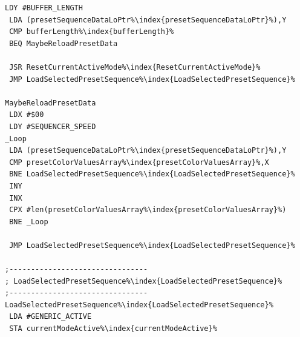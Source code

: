 \begin{minipage}[b]{0.33\linewidth}
\begin{lrbox}{\mybox}
\begin{lstlisting}[basicstyle=\ttfamily\tiny,escapechar=\%]
 LDY #BUFFER_LENGTH
 LDA (presetSequenceDataLoPtr%\index{presetSequenceDataLoPtr}%),Y
 CMP bufferLength%\index{bufferLength}%
 BEQ MaybeReloadPresetData

 JSR ResetCurrentActiveMode%\index{ResetCurrentActiveMode}%
 JMP LoadSelectedPresetSequence%\index{LoadSelectedPresetSequence}%

MaybeReloadPresetData
 LDX #$00
 LDY #SEQUENCER_SPEED
_Loop   
 LDA (presetSequenceDataLoPtr%\index{presetSequenceDataLoPtr}%),Y
 CMP presetColorValuesArray%\index{presetColorValuesArray}%,X
 BNE LoadSelectedPresetSequence%\index{LoadSelectedPresetSequence}%
 INY
 INX
 CPX #len(presetColorValuesArray%\index{presetColorValuesArray}%)
 BNE _Loop

 JMP LoadSelectedPresetSequence%\index{LoadSelectedPresetSequence}%

;--------------------------------
; LoadSelectedPresetSequence%\index{LoadSelectedPresetSequence}%
;--------------------------------
LoadSelectedPresetSequence%\index{LoadSelectedPresetSequence}%
 LDA #GENERIC_ACTIVE
 STA currentModeActive%\index{currentModeActive}%

\end{lstlisting}
\end{lrbox}%
\scalebox{0.8}{\usebox{\mybox}}
\end{minipage}
\hspace{-0.1cm}

